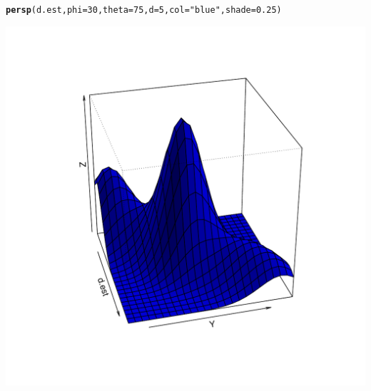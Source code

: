 \documentclass{article}\usepackage[]{graphicx}\usepackage[]{color}
\makeatletter
\def\maxwidth{ %
  \ifdim\Gin@nat@width>\linewidth
    \linewidth
  \else
    \Gin@nat@width
  \fi
}
\newcommand{\hlstr}[1]{\textcolor[rgb]{0.192,0.494,0.8}{#1}}%
\newcommand{\hlkwd}[1]{\textcolor[rgb]{0.737,0.353,0.396}{\textbf{#1}}}%
\newenvironment{kframe}{%
 \def\at@end@of@kframe{}%
 \ifinner\ifhmode%
  \def\at@end@of@kframe{\end{minipage}}%
  \begin{minipage}{\columnwidth}%
 \fi\fi%
 \def\FrameCommand##1{\hskip\@totalleftmargin \hskip-\fboxsep
 \colorbox{shadecolor}{##1}\hskip-\fboxsep
     \hskip-\linewidth \hskip-\@totalleftmargin \hskip\columnwidth}%
 \MakeFramed {\advance\hsize-\width
   \@totalleftmargin\z@ \linewidth\hsize
   \@setminipage}}%
 {\par\unskip\endMakeFramed%
 \at@end@of@kframe}
\newenvironment{knitrout}{}{} %
\makeatother
\begin{document}
\begin{itemize}
\begin{knitrout}
\begin{kframe}
\begin{alltt}
\hlkwd{persp}(d.est, phi = 30, theta = 75, d = 5, col = \hlstr{"blue"}, shade = 0.25)
\end{alltt}
\end{kframe}
\includegraphics[width=\maxwidth]{figure/tena2} 

\end{knitrout}

\end{itemize}
\end{document}
